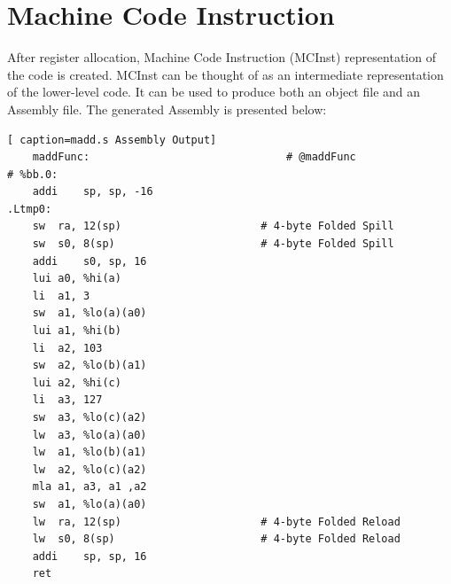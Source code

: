 \section{Machine Code Instruction}
After register allocation, Machine Code Instruction (MCInst) representation of the code is created. MCInst can be thought of as an intermediate representation of the lower-level code. It can be used to produce both an object file and an Assembly file. The generated Assembly is presented below:
\begin{lstlisting}[ caption=madd.s Assembly Output]
    maddFunc:                               # @maddFunc
# %bb.0:
	addi	sp, sp, -16
.Ltmp0:
	sw	ra, 12(sp)                      # 4-byte Folded Spill
	sw	s0, 8(sp)                       # 4-byte Folded Spill
	addi	s0, sp, 16
	lui	a0, %hi(a)
	li	a1, 3
	sw	a1, %lo(a)(a0)
	lui	a1, %hi(b)
	li	a2, 103
	sw	a2, %lo(b)(a1)
	lui	a2, %hi(c)
	li	a3, 127
	sw	a3, %lo(c)(a2)
	lw	a3, %lo(a)(a0)
	lw	a1, %lo(b)(a1)
	lw	a2, %lo(c)(a2)
	mla	a1, a3, a1 ,a2
	sw	a1, %lo(a)(a0)
	lw	ra, 12(sp)                      # 4-byte Folded Reload
	lw	s0, 8(sp)                       # 4-byte Folded Reload
	addi	sp, sp, 16
	ret
\end{lstlisting}
